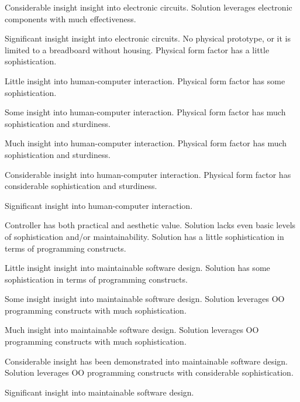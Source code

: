 \documentclass{../../fal_assignment}
\begin{document}
\begin{markingrubric}
	\par Considerable insight insight into electronic circuits.
	\grade Solution leverages electronic components with much effectiveness.
	\par Significant insight insight into electronic circuits.
	\grade\fail No physical prototype, or it is limited to a breadboard without housing.
	\grade Physical form factor has a little sophistication.
	\par Little insight into human-computer interaction.
	\grade Physical form factor has some sophistication.
	\par Some insight into human-computer interaction.
	\grade Physical form factor has much sophistication and sturdiness.
	\par Much insight into human-computer interaction.
	\grade Physical form factor has much sophistication  and sturdiness.
	\par Considerable insight into human-computer interaction.
	\grade Physical form factor has considerable sophistication and sturdiness.
	\par Significant insight into human-computer interaction.
	\par Controller has both practical and aesthetic value.
	\grade\fail Solution lacks even basic levels of sophistication and/or maintainability.
	\grade Solution has a little sophistication in terms of programming constructs.
	\par Little insight insight into maintainable software design.
	\grade Solution has some sophistication in terms of programming constructs.
	\par Some insight insight into maintainable software design.
	\grade Solution leverages OO programming constructs with much sophistication.
	\par Much insight into maintainable software design.
	\grade Solution leverages OO programming constructs with much sophistication.
	\par Considerable insight has been demonstrated into maintainable software design.
	\grade Solution leverages OO programming constructs with considerable sophistication.
	\par Significant insight into maintainable software design.
\end{markingrubric}
\end{document}
